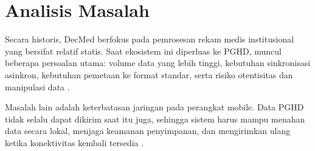 \section{Analisis Masalah}

Secara historis, DecMed berfokus pada pemrosesan rekam medis institusional yang bersifat relatif statis. Saat ekosistem ini diperluas ke PGHD, muncul beberapa persoalan utama: volume data yang lebih tinggi, kebutuhan sinkronisasi asinkron, kebutuhan pemetaan ke format standar, serta risiko otentisitas dan manipulasi data \parencite{Mars_Scott_2022,Khatiwada_Yang_Lin_Blobel_2024,Google_Fit_2025}.

Masalah lain adalah keterbatasan jaringan pada perangkat mobile. Data PGHD tidak selalu dapat dikirim saat itu juga, sehingga sistem harus mampu menahan data secara lokal, menjaga keamanan penyimpanan, dan mengirimkan ulang ketika konektivitas kembali tersedia \parencite{Omoloja_Vundavalli_2021}.